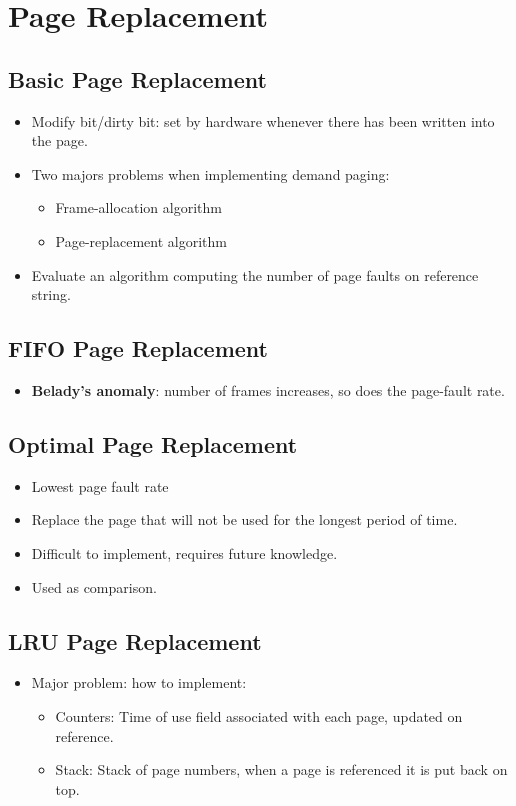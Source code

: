 \documentclass[10pt]{report}
\begin{document}
	\section{Page Replacement}
		\subsection{Basic Page Replacement}
			\begin{itemize}
				\item Modify bit/dirty bit: set by hardware whenever there has been written into the page.
				\item Two majors problems when implementing demand paging:
				\begin{itemize}
					\item Frame-allocation algorithm
					\item Page-replacement algorithm
				\end{itemize}
				\item Evaluate an algorithm computing the number of page faults on reference string.
			\end{itemize}

		\subsection{FIFO Page Replacement}
			\begin{itemize}
				\item \textbf{Belady's anomaly}: number of frames increases, so does the page-fault rate.
			\end{itemize}

		\subsection{Optimal Page Replacement}
			\begin{itemize}
				\item Lowest page fault rate
				\item Replace the page that will not be used for the longest period of time.
				\item Difficult to implement, requires future knowledge.
				\item Used as comparison.
			\end{itemize}

		\subsection{LRU Page Replacement}
			\begin{itemize}
				\item Major problem: how to implement:
				\begin{itemize}
					\item Counters: Time of use field associated with each page, updated on reference.
					\item Stack: Stack of page numbers, when a page is referenced it is put back on top.
				\end{itemize}
			\end{itemize}
\end{document}
